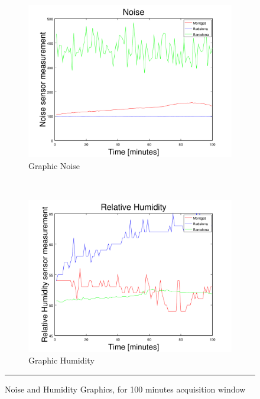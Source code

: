 \documentclass[12pt, a4paper,twoside]{tesi_upf}
\begin{document}
			\begin{figure}[H]
        \centering
        \begin{subfigure}[b]{0.49\textwidth}
                \includegraphics[width=\textwidth]{./Figures/GraphicNoise.png}
                \caption{Graphic Noise}
                \label{fig:GraphicNoise}
        \end{subfigure}%
        ~ %
        \begin{subfigure}[b]{0.49\textwidth}
                \includegraphics[width=\textwidth]{./Figures/GraphicHumidity.png}
                \caption{Graphic Humidity}
                \label{fig:GraphicHumidity}
        \end{subfigure}
        \rule{30em}{0.5pt}
        \caption{Noise and Humidity Graphics, for 100 minutes acquisition window}\label{fig:TestbedResults1}
			\end{figure}
\end{document}
